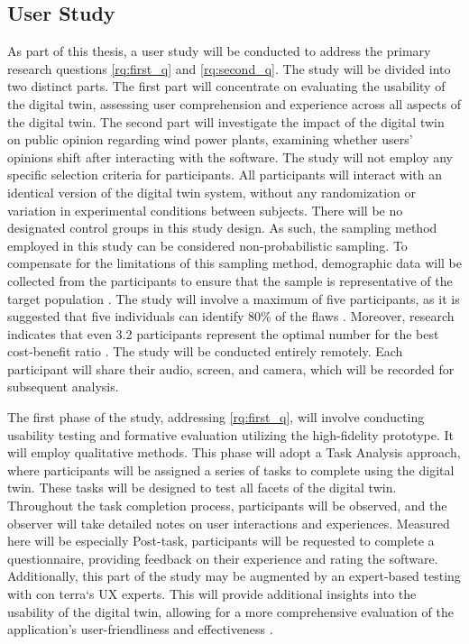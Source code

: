 \documentclass[11pt, titlepage, a4paper]{scrartcl}
\begin{document}
\begin{linenumbers}
\subsection{User Study}
As part of this thesis, a user study will be conducted to address the primary research questions \cref{rq:first_q} and \cref{rq:second_q}. The study will be divided into two distinct parts. The first part will concentrate on evaluating the usability of the digital twin, assessing user comprehension and experience across all aspects of the digital twin. The second part will investigate the impact of the digital twin on public opinion regarding wind power plants, examining whether users' opinions shift after interacting with the software.
The study will not employ any specific selection criteria for participants. All participants will interact with an identical version of the digital twin system, without any randomization or variation in experimental conditions between subjects. There will be no designated control groups in this study design. As such, the sampling method employed in this study can be considered non-probabilistic sampling. To compensate for the limitations of this sampling method, demographic data will be collected from the participants to ensure that the sample is representative of the target population \cite{lazarResearchMethodsHuman2017}.
The study will involve a maximum of five participants, as it is suggested that five individuals can identify 80\% of the flaws \cite{virziRefiningTestPhase1992}. Moreover, research indicates that even 3.2 participants represent the optimal number for the best cost-benefit ratio \cite{nielsenMathematicalModelFinding1993}.
The study will be conducted entirely remotely. Each participant will share their audio, screen, and camera, which will be recorded for subsequent analysis.

The first phase of the study, addressing \cref{rq:first_q}, will involve conducting usability testing and formative evaluation utilizing the high-fidelity prototype. It will employ qualitative methods. This phase will adopt a Task Analysis approach, where participants will be assigned a series of tasks to complete using the digital twin. These tasks will be designed to test all facets of the digital twin. Throughout the task completion process, participants will be observed, and the observer will take detailed notes on user interactions and experiences. Measured here will be especially
Post-task, participants will be requested to complete a questionnaire, providing feedback on their experience and rating the software. Additionally, this part of the study may be augmented by an expert-based testing with con terra`s UX experts. This will provide additional insights into the usability of the digital twin, allowing for a more comprehensive evaluation of the application's user-friendliness and effectiveness \cite{lazarResearchMethodsHuman2017}.


\end{linenumbers}
\end{document}
